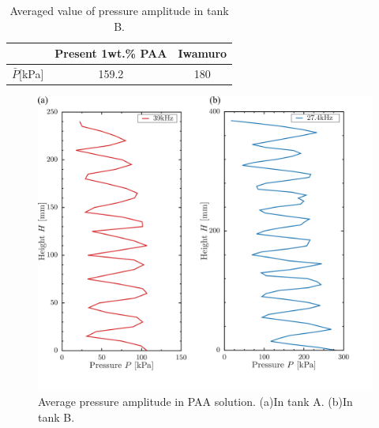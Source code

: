 \begin{table}[h]
    \centering
    \caption{Averaged value of pressure amplitude in tank B.}
    \label{table:press-B}
    \begin{tabular}{c|c|c}\hline
                       & Present 1wt.\% PAA & Iwamuro \cite{ref:9} \\ \hline
        $\bar{P}$[kPa] & 159.2              & 180                              \\ \hline
    \end{tabular}
\end{table}

\begin{figure}[ht]
    \centering
    \includegraphics[width=12cm,clip]{4-Results/press.png}
    \caption{Average pressure amplitude in PAA solution. (a)In tank A. (b)In tank B.}
    \label{fig:pressure}
\end{figure}
